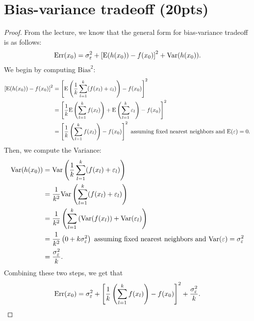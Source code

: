 \documentclass[12pt]{article}
\newcommand{\Err}{\textnormal{Err}}
\newcommand{\Var}{\textnormal{Var}}
\newcommand{\Ev}{\textnormal{E}}
\renewcommand{\epsilon}{\varepsilon}
\theoremstyle{definition}
\begin{document}
	\section{Bias-variance tradeoff (20pts)}
	\begin{proof}
		From the lecture, we know that the general form for bias-variance tradeoff is as follows: 
		\[\Err(x_0) = \sigma^2_\epsilon + \left[\Ev(h(x_0))-f(x_0)\right]^2 + \Var(h(x_0)).\]
		We begin by computing $\text{Bias}^2$:
		\begin{align*}
		\left[\Ev(h(x_0))-f(x_0)\right]^2 &= \left[\Ev\left(\frac{1}{k}\sum_{l=1}^{k}(f(x_l)+\epsilon_l)\right)-f(x_0)\right]^2 \\
		&= \left[\frac{1}{k}\Ev\left(\sum_{l=1}^{k}f(x_l)\right)+\Ev\left(\sum_{l=1}^{k}\epsilon_l\right)-f(x_0)\right]^2\\
		&= \left[\frac{1}{k}\left(\sum_{l=1}^{k}f(x_l)\right)-f(x_0)\right]^2 \text{ assuming fixed nearest neighbors and } \Ev(\epsilon) = 0.
		\end{align*}
		Then, we compute the Variance:
		\begin{align*}
		\Var(h(x_0)) &= \Var\left(\frac{1}{k}\sum_{l=1}^{k}(f(x_l)+\epsilon_l)\right) \\
		&= \frac{1}{k^2} \Var\left(\sum_{l=1}^{k}(f(x_l)+\epsilon_l)\right) \\
		&= \frac{1}{k^2}\left(\sum_{l=1}^{k}\left(\Var(f(x_l))+\Var(\epsilon_l\right)\right) \\
		&= \frac{1}{k^2}\left(0+k\sigma^2_{\epsilon}\right) \text{ assuming fixed nearest neighbors and } \Var(\epsilon) = \sigma^2_\epsilon \\
		&= \frac{\sigma^2_\epsilon}{k}.
		\end{align*}
		Combining these two steps, we get that
		\[\Err(x_0) = \sigma^2_\epsilon + \left[\frac{1}{k}\left(\sum_{l=1}^{k}f(x_l)\right)-f(x_0)\right]^2 + \frac{\sigma^2_\epsilon}{k}.\]
	\end{proof}
\end{document}
